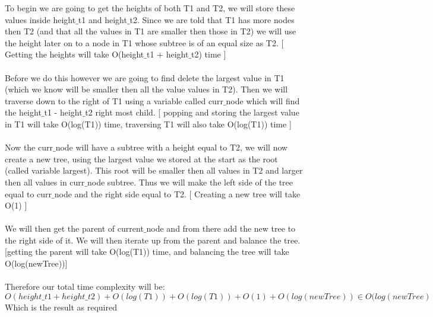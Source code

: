 \documentclass[12pt]{article}
\begin{document}
\begin{adjustwidth}{0em}{0pt}
To begin we are going to get the heights of both T1 and T2, we will store these values inside height$\_$t1 and height$\_$t2. Since we are told that T1 has more nodes then T2 (and that all the values in T1 are smaller then those in T2) we will use the height later on to a node in T1 whose subtree is of an equal size as T2. [ Getting the heights will take O(height$\_$t1 + height$\_$t2) time ]\\ \\
Before we do this however we are going to find delete the largest value in T1 (which we know will be smaller then all the value values in T2). Then we will traverse down to the right of T1 using a variable called curr$\_$node which will find the height$\_$t1 - height$\_$t2 right most child. [ popping and storing the largest value in T1 will take O(log(T1)) time, traversing T1 will also take O(log(T1)) time ] \\ \\
Now the curr$\_$node will have a subtree with a height equal to T2, we will now create a new tree, using the largest value we stored at the start as the root (called variable largest). This root will be smaller then all values in T2 and larger then all values in curr$\_$node subtree. Thus we will make the left side of the tree equal to curr$\_$node and the right side equal to T2. [ Creating a new tree will take O(1) ]  \\ \\
We will then get the parent of current$\_$node and from there add the new tree to the right side of it. We will then iterate up from the parent and balance the tree. [getting the parent will take O(log(T1)) time, and balancing the tree will take O(log(newTree))] \\ \\
Therefore our total time complexity will be:
\[ O(height\_t1 + height \_ t2) + O(log(T1)) + O(log(T1)) + O(1) +  O(log(newTree)) \in O(log(newTree) \]
Which is the result as required


\end{adjustwidth} 
\end{document}
